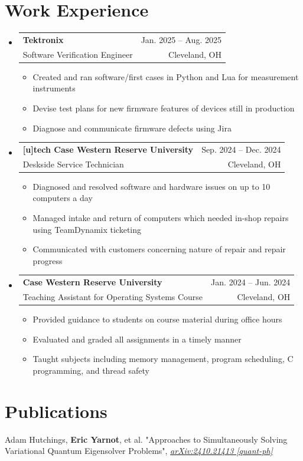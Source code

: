 \documentclass[letterpaper,11pt]{article}
\makeatletter
\newcommand{\resumeItem}[1]{
  \item\small{
    {#1 \vspace{-2pt}}
  }
}
\newcommand{\resumeSubheading}[4]{
  \vspace{-2pt}\item
    \begin{tabular*}{0.97\textwidth}[t]{l@{\extracolsep{\fill}}r}
      \textbf{#1} & #2 \\
      {\small#3} & {\small #4} \\
    \end{tabular*}\vspace{-7pt}
}
\newcommand{\resumePublication}[2]{
  \item \small #1, \textit{#2}\vspace{-4pt}
}
\newcommand{\resumeSubHeadingListStart}{\begin{itemize}[leftmargin=0.15in, label={}]}
\newcommand{\resumeSubHeadingListEnd}{\end{itemize}}
\newcommand{\resumeItemListStart}{\begin{itemize}}
\newcommand{\resumeItemListEnd}{\end{itemize}\vspace{-5pt}}
\makeatother
\begin{document}
\section{Work Experience}
  \resumeSubHeadingListStart
    \resumeSubheading
      {Tektronix}{Jan. 2025 -- Aug. 2025}
      {Software Verification Engineer}{Cleveland, OH}
      \resumeItemListStart
        \resumeItem{Created and ran software/first cases in Python and Lua for measurement instruments}
        \resumeItem{Devise test plans for new firmware features of devices still in production}
        \resumeItem{Diagnose and communicate firmware defects using Jira}
      \resumeItemListEnd
    \resumeSubheading
      {[u]tech Case Western Reserve University}{Sep. 2024 -- Dec. 2024}
      {Deskside Service Technician}{Cleveland, OH}
      \resumeItemListStart
        \resumeItem{Diagnosed and resolved software and hardware issues on up to 10 computers a day}
        \resumeItem{Managed intake and return of computers which needed in-shop repairs using TeamDynamix ticketing}
        \resumeItem{Communicated with customers concerning nature of repair and repair progress}
      \resumeItemListEnd
    \resumeSubheading
      {Case Western Reserve University}{Jan. 2024 -- Jun. 2024}
      {Teaching Assistant for Operating Systems Course}{Cleveland, OH}
      \resumeItemListStart
        \resumeItem{Provided guidance to students on course material during office hours}
        \resumeItem{Evaluated and graded all assignments in a timely manner}
        \resumeItem{Taught subjects including memory management, program scheduling, C programming, and thread safety}
      \resumeItemListEnd
  \resumeSubHeadingListEnd

\section{Publications}
  \begin{enumerate}[leftmargin=0.15in, label={[\arabic*]}]
    
    \resumePublication
      {Adam Hutchings, \textbf{Eric Yarnot}, et al. "Approaches to Simultaneously Solving Variational Quantum Eigensolver Problems"}
       {\href{https://arxiv.org/abs/2410.21413}{arXiv:2410.21413 [quant-ph]}}
      

  \end{enumerate}


\end{document}
